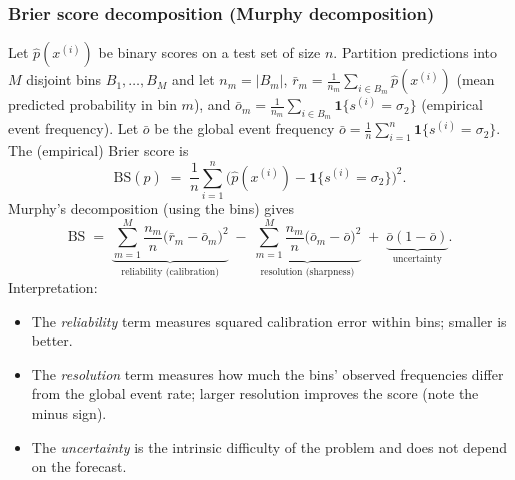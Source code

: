 \subsubsection{Brier score decomposition (Murphy decomposition)}
Let \(\widehat p(x^{(i)})\) be binary scores on a test set of size \(n\). Partition predictions into \(M\) disjoint bins \(B_1,\dots,B_M\) and let \(n_m=|B_m|\), \(\bar r_m = \frac{1}{n_m}\sum_{i\in B_m}\widehat p(x^{(i)})\) (mean predicted probability in bin \(m\)), and \(\bar o_m = \frac{1}{n_m}\sum_{i\in B_m}\mathbf{1}\{s^{(i)}=\sigma_2\}\) (empirical event frequency). Let \(\bar o\) be the global event frequency \(\bar o=\frac{1}{n}\sum_{i=1}^n \mathbf{1}\{s^{(i)}=\sigma_2\}\). The (empirical) Brier score is
\[
\mathrm{BS}(\widehat p) \;=\; \frac{1}{n}\sum_{i=1}^n \big(\widehat p(x^{(i)}) - \mathbf{1}\{s^{(i)}=\sigma_2\}\big)^2.
\]
Murphy's decomposition (using the bins) gives
\[
\mathrm{BS} \;=\; \underbrace{\sum_{m=1}^M \frac{n_m}{n}\big(\bar r_m - \bar o_m\big)^2}_{\text{reliability (calibration)}} \;-\; \underbrace{\sum_{m=1}^M \frac{n_m}{n}\big(\bar o_m - \bar o\big)^2}_{\text{resolution (sharpness)}} \;+\; \underbrace{\bar o(1-\bar o)}_{\text{uncertainty}}.
\]
Interpretation:
\begin{itemize}
	\item The \emph{reliability} term measures squared calibration error within bins; smaller is better.
	\item The \emph{resolution} term measures how much the bins' observed frequencies differ from the global event rate; larger resolution improves the score (note the minus sign).
	\item The \emph{uncertainty} is the intrinsic difficulty of the problem and does not depend on the forecast.
\end{itemize}


